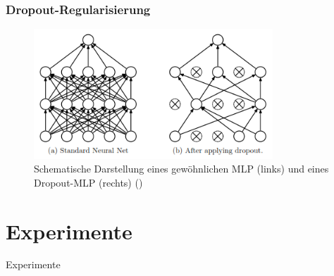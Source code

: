 \documentclass{beamer}
\begin{document}
\begin{frame}
\frametitle{Dropout-Regularisierung}
\begin{figure}
\centering
\includegraphics[width=0.8\textwidth]{images/4_dropout}
\caption{Schematische Darstellung eines gewöhnlichen MLP (links)
und eines Dropout-MLP (rechts) (\cite{Srivastava2014})}
\end{figure}
\end{frame}


%
%




%
%
\section{Experimente}
\begin{frame}
\begin{center}
\Huge Experimente
\end{center}
\end{frame}

\end{document}
